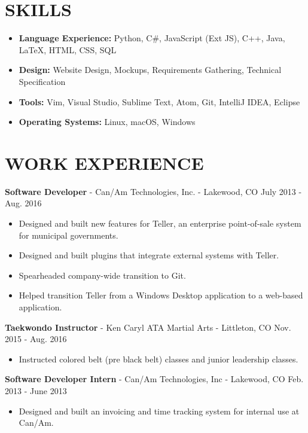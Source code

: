 \documentclass[10.5pt,letterpaper]{article}
\begin{document}
\section*{SKILLS}
{\renewcommand\labelitemi{}
    \renewcommand\leftmargini{0pt}
    \begin{itemize}
        \item \textbf{Language Experience:} Python, C\#, JavaScript (Ext JS), C++,
            Java, \LaTeX, HTML, CSS, SQL
        \item \textbf{Design:} Website Design, Mockups, Requirements Gathering,
            Technical Specification
        \item \textbf{Tools:} Vim, Visual Studio, Sublime Text, Atom, Git,
            IntelliJ IDEA, Eclipse
        \item \textbf{Operating Systems:} Linux, macOS, Windows
    \end{itemize}
}

\section*{WORK EXPERIENCE}
\textbf{Software Developer} - Can/Am Technologies, Inc. - Lakewood, CO
\hfill July 2013 - Aug. 2016
\begin{itemize}
    \item Designed and built new features for Teller, an enterprise
        point-of-sale system for municipal governments.
    \item Designed and built plugins that integrate external systems with
        Teller.
    \item Spearheaded company-wide transition to Git.
    \item Helped transition Teller from a Windows Desktop application to a
        web-based application.
\end{itemize}

\vspace{4pt}
\textbf{Taekwondo Instructor} - Ken Caryl ATA Martial Arts - Littleton, CO
\hfill Nov. 2015 - Aug. 2016
\begin{itemize}
    \item Instructed colored belt (pre black belt) classes and junior leadership
        classes.
\end{itemize}

\vspace{4pt}
\textbf{Software Developer Intern} - Can/Am Technologies, Inc - Lakewood, CO
\hfill Feb. 2013 - June 2013
\begin{itemize}
    \item Designed and built an invoicing and time tracking system for internal
        use at Can/Am.
\end{itemize}
\end{document}
